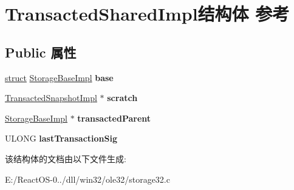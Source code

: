 \hypertarget{struct_transacted_shared_impl}{}\section{Transacted\+Shared\+Impl结构体 参考}
\label{struct_transacted_shared_impl}
\subsection*{Public 属性}
\begin{DoxyCompactItemize}
\item 
\mbox{\label{struct_transacted_shared_impl_a9d3985942b280c56a70f726329497d35}} 
\hyperlink{interfacestruct}{struct} \hyperlink{struct_storage_base_impl}{Storage\+Base\+Impl} {\bfseries base}
\item 
\mbox{\label{struct_transacted_shared_impl_a813a3a27faa18e595dc6286e851ed199}} 
\hyperlink{struct_transacted_snapshot_impl}{Transacted\+Snapshot\+Impl} $\ast$ {\bfseries scratch}
\item 
\mbox{\label{struct_transacted_shared_impl_a54f56918d3c7f42313e13b182ab7c8cc}} 
\hyperlink{struct_storage_base_impl}{Storage\+Base\+Impl} $\ast$ {\bfseries transacted\+Parent}
\item 
\mbox{\label{struct_transacted_shared_impl_a27fc05d56febaae24b1297fd94b99267}} 
U\+L\+O\+NG {\bfseries last\+Transaction\+Sig}
\end{DoxyCompactItemize}


该结构体的文档由以下文件生成\+:\begin{DoxyCompactItemize}
\item 
E\+:/\+React\+O\+S-\/0../dll/win32/ole32/storage32.\+c\end{DoxyCompactItemize}
